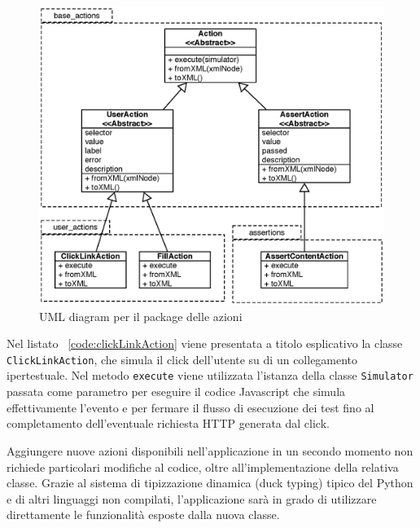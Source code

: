 \begin{figure}[htbp]
\begin{center}
\includegraphics[width=\textwidth]{images/uml_actions.eps}
\caption{UML diagram per il package delle azioni}
\label{fig:actionUML}
\end{center}
\end{figure}

Nel listato ~\ref{code:clickLinkAction} viene presentata a titolo esplicativo la classe \verb|ClickLinkAction|, che simula il click dell'utente su di un collegamento ipertestuale. Nel metodo \verb|execute| viene utilizzata l'istanza della classe \verb|Simulator| passata come parametro per eseguire il codice Javascript che simula effettivamente l'evento e per fermare il flusso di esecuzione dei test fino al completamento dell'eventuale richiesta HTTP generata dal click.



Aggiungere nuove azioni disponibili nell'applicazione in un secondo momento non richiede particolari modifiche al codice, oltre all'implementazione della relativa classe. Grazie al sistema di tipizzazione dinamica (duck typing) tipico del Python e di altri linguaggi non compilati, l'applicazione sarà in grado di utilizzare direttamente le funzionalità esposte dalla nuova classe.

